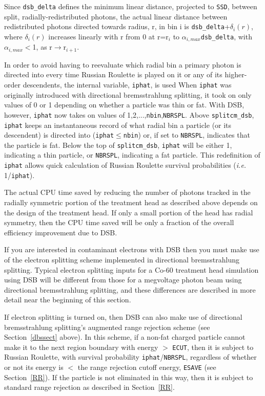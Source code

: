 \documentclass[12pt,twoside]{article}
\begin{document}
Since {\tt dsb\_delta} defines the minimum linear distance, projected to {\tt SSD}, between split, radially-redistributed photons, the actual linear distance between redistributed photons directed towards radius, r, in bin i is
{\tt dsb\_delta}+$\delta_i(r)$, where $\delta_i(r)$ increases linearly with r from 0 at r=r$_i$ to
$\alpha_{i,max}${\tt dsb\_delta}, with $\alpha_{i,max}<$1, as r$\rightarrow$r$_{i+1}$.

In order to avoid having to reevaluate which radial bin a primary photon is directed into every time Russian
Roulette is played on it or any of its higher-order descendents, the internal variable, {\tt iphat}, is used
When {\tt iphat} was originally introduced with directional bremsstrahlung splitting, it took on only values of 0 or 1
depending on whether a particle was thin
or fat.  With DSB, however, {\tt iphat} now takes on values of 1,2,...,{\tt nbin},{\tt NBRSPL}.
Above {\tt splitcm\_dsb}, {\tt iphat} keeps an instantaneous record of what radial bin a particle (or its descendent)
is directed into ({\tt iphat}$\leq${\tt nbin}) or, if set to {\tt NBRSPL}, indicates that the particle is fat.
Below the top of {\tt splitcm\_dsb}, {\tt iphat} will be either 1, indicating a thin particle, or {\tt NBRSPL}, indicating a fat particle.  This redefinition of {\tt iphat} allows quick calculation of Russian Roulette survival
probabilities ({\em i.e.} 1/{\tt iphat}).

The actual CPU time saved by reducing the number of photons tracked in the radially symmetric portion of
the treatment head as described above depends on the design of the treatment head.  If only a small portion
of the head has radial symmetry, then the CPU time saved will be only a fraction of the overall efficiency
improvement due to DSB.

If you are interested in contaminant electrons with DSB then you must make use of
the electron splitting scheme implemented in directional bremsstrahlung splitting.  Typical electron splitting
inputs for a Co-60 treatment head simulation using DSB will be different from those for a megvoltage
photon beam using directional bremsstrahlung splitting, and these differences are described in more detail near
the beginning of this section.

If electron splitting is turned on, then DSB can also make use of directional bremsstrahlung splitting's augmented range rejection scheme (see Section~\ref{dbssect} above).  In this scheme, if a non-fat charged particle cannot make it to
the next region boundary with energy $>$ {\tt ECUT}, then it is subject to Russian Roulette, with survival
probability {\tt iphat}/{\tt NBRSPL}, regardless of whether or not its energy is $<$ the range rejection cutoff
energy, {\tt ESAVE} (see Section~\ref{RR}).  If the particle is not eliminated in this way, then
it is subject to standard range rejection as described in Section~\ref{RR}.
\end{document}
